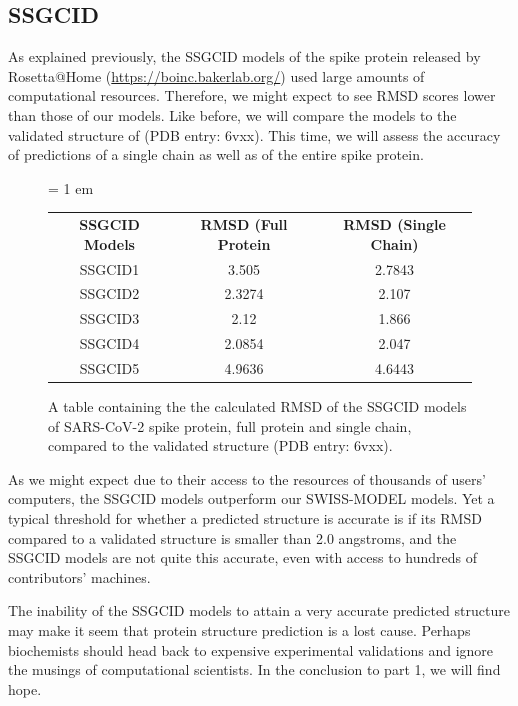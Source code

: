 \begin{qbox}\end{qbox}

\FloatBarrier
{}
\subsection{SSGCID}

As explained previously, the SSGCID models of the spike protein released by Rosetta@Home (\url{https://boinc.bakerlab.org/}) used large amounts of computational resources. Therefore, we might expect to see RMSD scores lower than those of our models. Like before, we will compare the models to the validated structure of (PDB entry: 6vxx). This time, we will assess the accuracy of predictions of a single chain as well as of the entire spike protein.

\begin{figure}[h]
	\centering
	\tabcolsep = 1 em
	\mySfFamily
	\begin{tabular}{c c c}
		\textbf{SSGCID Models} & \textbf{RMSD (Full Protein} & \textbf{RMSD (Single Chain)} \\
		SSGCID1  & 3.505 & 2.7843 \\
		SSGCID2  & 2.3274 & 2.107 \\
		SSGCID3  & 2.12 & 1.866 \\
		SSGCID4  & 2.0854 & 2.047 \\
		SSGCID5  & 4.9636 & 4.6443 \\
	\end{tabular}
	\caption{A table containing the the calculated RMSD of the SSGCID models of SARS-CoV-2 spike protein, full protein and single chain, compared to the validated structure (PDB entry: 6vxx).}
	\label{fig:ssgcid_rmsd_table}
\end{figure}

As we might expect due to their access to the resources of thousands of users' computers, the SSGCID models outperform our SWISS-MODEL models. Yet a typical threshold for whether a predicted structure is accurate is if its RMSD compared to a validated structure is smaller than 2.0 angstroms, and the SSGCID models are not quite this accurate, even with access to hundreds of contributors' machines.

The inability of the SSGCID models to attain a very accurate predicted structure may make it seem that protein structure prediction is a lost cause. Perhaps biochemists should head back to expensive experimental validations and ignore the musings of computational scientists. In the conclusion to part 1, we will find hope.

